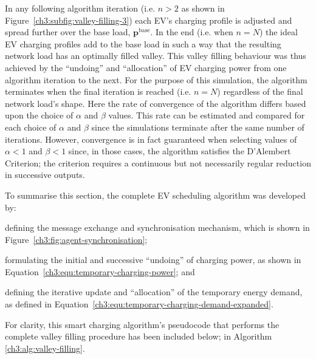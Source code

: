 In any following algorithm iteration (i.e. $n>2$ as shown in Figure~\ref{ch3:subfig:valley-filling-3}) each EV's charging profile is adjusted and spread further over the base load, $\textbf{p}^\text{base}$.
In the end (i.e. when $n=N$) the ideal EV charging profiles add to the base load in such a way that the resulting network load has an optimally filled valley.
This valley filling behaviour was thus achieved by the ``undoing'' and ``allocation'' of EV charging power from one algorithm iteration to the next.
For the purpose of this simulation, the algorithm terminates when the final iteration is reached (i.e. $n=N$) regardless of the final network load's shape.
Here the rate of convergence of the algorithm differs based upon the choice of $\alpha$ and $\beta$ values.
This rate can be estimated and compared for each choice of $\alpha$ and $\beta$ since the simulations terminate after the same number of iterations.
However, convergence is in fact guaranteed when selecting values of $\alpha < 1$ and $\beta < 1$ since, in those cases, the algorithm satisfies the D'Alembert Criterion; the criterion requires a continuous but not necessarily regular reduction in successive outputs.

To summarise this section, the complete EV scheduling algorithm was developed by: 
\begin{enumerate*}
	\item defining the message exchange and synchronisation mechanism, which is shown in Figure~\ref{ch3:fig:agent-synchronisation};
	\item formulating the initial and successive ``undoing'' of charging power, as shown in Equation~\ref{ch3:equ:temporary-charging-power}; and
	\item defining the iterative update and ``allocation'' of the temporary energy demand, as defined in Equation~\ref{ch3:equ:temporary-charging-demand-expanded}.
\end{enumerate*}
For clarity, this smart charging algorithm's pseudocode that performs the complete valley filling procedure has been included below; in Algorithm \ref{ch3:alg:valley-filling}.















